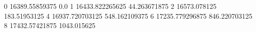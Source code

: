 0 16389.55859375 0.0
1 16433.822265625 44.263671875
2 16573.078125 183.51953125
4 16937.720703125 548.162109375
6 17235.779296875 846.220703125
8 17432.57421875 1043.015625
